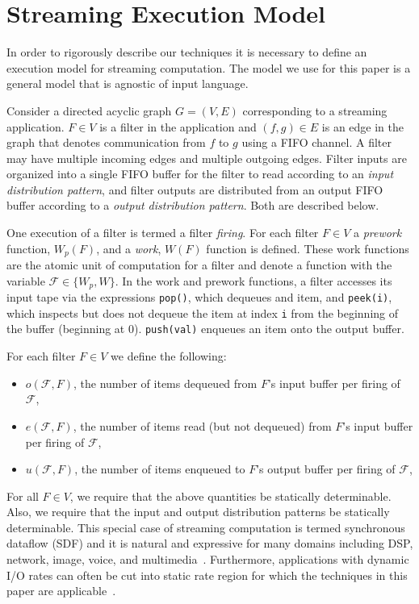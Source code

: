 \section{Streaming Execution Model}

In order to rigorously describe our techniques it is necessary to
define an execution model for streaming computation. The model we use
for this paper is a general model that is agnostic of input language.

Consider a directed acyclic graph $G = (V, E)$ corresponding to a
streaming application. $F \in V$ is a filter in the application and
$(f, g) \in E$ is an edge in the graph that denotes communication from
$f$ to $g$ using a FIFO channel.  A filter may have multiple incoming
edges and multiple outgoing edges.  Filter inputs are organized into a
single FIFO buffer for the filter to read according to an {\it input
distribution pattern}, and filter outputs are distributed from an
output FIFO buffer according to a {\it output distribution pattern}.  Both
are described below.

One execution of a filter is termed a filter {\it firing}. For each
filter $F \in V$ a {\it prework} function, $W_p(F)$, and a {\it work},
$W(F)$ function is defined.  These work functions are the atomic unit
of computation for a filter and denote a function with the variable
$\mathcal{F} \in \{W_p, W\}$.  In the work and prework functions, a
filter accesses its input tape via the expressions {\tt pop()}, which
dequeues and item, and {\tt peek(i)}, which inspects but does not
dequeue the item at index {\tt i} from the beginning of the buffer
(beginning at 0).  {\tt push(val)} enqueues an item onto the output
buffer.

For each filter $F \in V$ we define the following:
\begin{itemize}

\item $o(\mathcal{F}, F)$, the number of items dequeued from $F$'s
input buffer per firing of $\mathcal{F}$,

\item $e(\mathcal{F}, F)$, the number of items read (but not dequeued)
from $F$'s input buffer per firing of $\mathcal{F}$,

\item $u(\mathcal{F}, F)$, the number of items enqueued to $F$'s
output buffer per firing of $\mathcal{F}$,

\end{itemize}

For all $F \in V$, we require that the above quantities be statically
determinable.  Also, we require that the input and output distribution
patterns be statically determinable.  This special case of streaming
computation is termed synchronous dataflow (SDF) and it is natural and
expressive for many domains including DSP, network, image, voice, and
multimedia~\cite{leeSDF}.  Furthermore, applications with dynamic
I/O rates can often be cut into static rate region for which the
techniques in this paper are applicable~\cite{chen:graphics-hardware:2005}.

